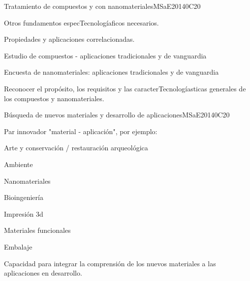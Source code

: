 \begin{syllabus}
\begin{unit}{Tratamiento de compuestos y con nanomateriales}{}{MSaE2014}{0}{C20}
\begin{topics}
      \item Otros fundamentos especTecnologíaficos necesarios.
      \item Propiedades y aplicaciones correlacionadas.
      \item Estudio de compuestos - aplicaciones tradicionales y de vanguardia
      \item Encuesta de nanomateriales: aplicaciones tradicionales y de vanguardia
\end{topics}
   \begin{learningoutcomes}
      \item Reconocer el propósito, los requisitos y las caracterTecnologíasticas generales de los compuestos y nanomateriales.
   \end{learningoutcomes}
\end{unit}

\begin{unit}{Búsqueda de nuevos materiales y desarrollo de aplicaciones}{}{MSaE2014}{0}{C20}
\begin{topics}
      \item Par innovador  "material - aplicación", por ejemplo:
	  \begin{subtopics}
	    \item  Arte y conservación / restauración arqueológica
	    \item  Ambiente
	    \item  Nanomateriales
	    \item  Bioingeniería
	    \item  Impresión 3d
	    \item  Materiales funcionales
	    \item  Embalaje
	  \end{subtopics}  
\end{topics}
   \begin{learningoutcomes}
      \item Capacidad para integrar la comprensión de los nuevos materiales a las aplicaciones en desarrollo.
   \end{learningoutcomes}
\end{unit}












\begin{coursebibliography}
\end{coursebibliography}
\end{syllabus}
